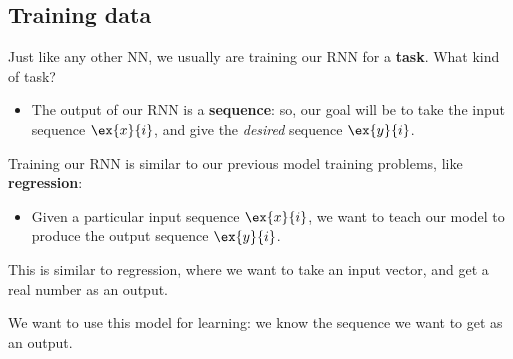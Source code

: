     \pagebreak
    \subsection{Training data}

        Just like any other NN, we usually are training our RNN for a \textbf{task}. What kind of task?

        \begin{itemize}
            \item The output of our RNN is a \textbf{sequence}: so, our goal will be to take the input sequence $\ex{x}{i}$, and give the \textit{desired} sequence $\ex{y}{i}$.\\
        \end{itemize}

        \begin{concept}
            Training our RNN is similar to our previous model training problems, like \textbf{regression}:

            \begin{itemize}
                \item Given a particular input sequence $\ex{x}{i}$, we want to teach our model to produce the output sequence $\ex{y}{i}$.
            \end{itemize}

            This is similar to regression, where we want to take an input vector, and get a real number as an output.

        \end{concept}

        We want to use this model for  learning: we know the sequence we want to get as an output.\\

